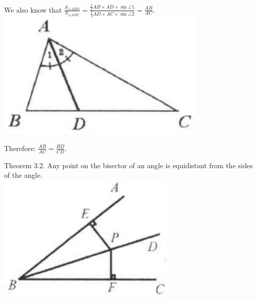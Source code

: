 \documentclass{article}
\begin{document}
We also know that \(\frac{S_{\triangle A B D}}{S_{\triangle A D C}}=\frac{\frac{1}{2} A B \times A D \times \sin \angle 1}{\frac{1}{2} A D \times A C \times \sin \angle 2}=\frac{A B}{A C}\).\\
\centering
\includegraphics[width=\textwidth]{images/053(1).jpg}

Therefore: \(\frac{A B}{A C}=\frac{B D}{C D}\).

Theorem 3.2. Any point on the bisector of an angle is equidistant from the sides of the angle.\\
\centering
\includegraphics[width=\textwidth]{images/053(2).jpg}
\end{document}
